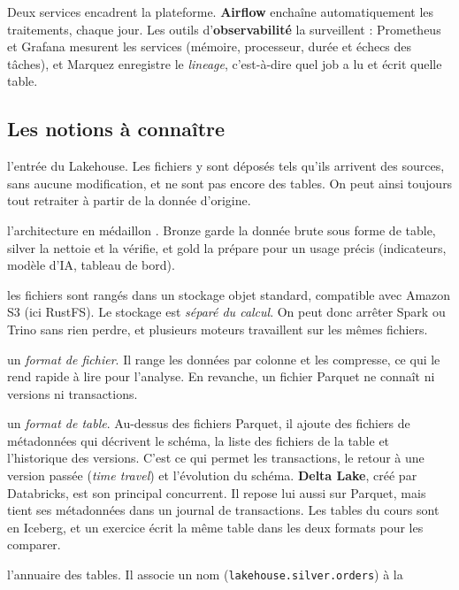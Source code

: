 Deux services encadrent la plateforme. \textbf{Airflow} enchaîne automatiquement les traitements,
chaque jour. Les outils d'\textbf{observabilité} la surveillent : Prometheus et Grafana mesurent les
services (mémoire, processeur, durée et échecs des tâches), et Marquez enregistre le \emph{lineage},
c'est-à-dire quel job a lu et écrit quelle table.

\subsection*{Les notions à connaître}

\begin{description}[leftmargin=1.4em,labelindent=0pt,itemsep=4pt,font=\normalfont\bfseries]
\item[Zone d'atterrissage (\emph{landing}) :] l'entrée du Lakehouse. Les fichiers y sont déposés
  tels qu'ils arrivent des sources, sans aucune modification, et ne sont pas encore des tables.
  On peut ainsi toujours tout retraiter à partir de la donnée d'origine.
\item[Couches bronze, silver, gold :] l'architecture \og en médaillon \fg{}. Bronze garde la donnée
  brute sous forme de table, silver la nettoie et la vérifie, et gold la prépare pour un usage
  précis (indicateurs, modèle d'IA, tableau de bord).
\item[Stockage ouvert :] les fichiers sont rangés dans un stockage objet standard, compatible avec
  Amazon S3 (ici RustFS). Le stockage est \emph{séparé du calcul}. On peut donc arrêter Spark ou
  Trino sans rien perdre, et plusieurs moteurs travaillent sur les mêmes fichiers.
\item[Parquet :] un \emph{format de fichier}. Il range les données par colonne et les compresse, ce qui
  le rend rapide à lire pour l'analyse. En revanche, un fichier Parquet ne connaît ni versions ni
  transactions.
\item[Iceberg :] un \emph{format de table}. Au-dessus des fichiers Parquet, il ajoute des fichiers
  de métadonnées qui décrivent le schéma, la liste des fichiers de la table et l'historique des
  versions. C'est ce qui permet les transactions, le retour à une version passée (\emph{time travel})
  et l'évolution du schéma. \textbf{Delta Lake}, créé par Databricks, est son principal concurrent.
  Il repose lui aussi sur Parquet, mais tient ses métadonnées dans un journal de transactions. Les
  tables du cours sont en Iceberg, et un exercice écrit la même table dans les deux formats pour les
  comparer.
\item[Catalogue :] l'annuaire des tables. Il associe un nom (\texttt{lakehouse.silver.orders}) à la

\end{description}
